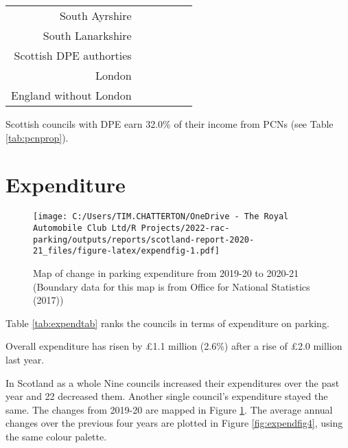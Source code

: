 \documentclass[
  12pt,
]{article}
\begin{document}
\begin{longtable}[t]{rrrrrr}
South Ayrshire & \cellcolor{white}{16.7\%} & \cellcolor{white}{21.8\%} & \cellcolor{white}{22.3\%} & \cellcolor{white}{40.4\%} & \cellcolor{white}{23.9\%}\\
South Lanarkshire & \cellcolor{white}{32.1\%} & \cellcolor{white}{30.7\%} & \cellcolor{white}{31.5\%} & \cellcolor{white}{32.2\%} & \cellcolor{white}{67.2\%}\\
Scottish DPE authorties & \cellcolor{white}{20.0\%} & \cellcolor{white}{20.0\%} & \cellcolor{white}{20.0\%} & \cellcolor{white}{20.6\%} & \cellcolor{white}{20.9\%}\\
London & \cellcolor{white}{42.0\%} & \cellcolor{white}{43.1\%} & \cellcolor{white}{45.1\%} & \cellcolor{white}{} & \cellcolor{white}{}\\
England without London & \cellcolor{white}{12.8\%} & \cellcolor{white}{13.8\%} & \cellcolor{white}{12.3\%} & \cellcolor{white}{} & \cellcolor{white}{}\\*
\end{longtable}
\endgroup{}

Scottish councils with DPE earn 32.0\% of their income from PCNs (see Table \ref{tab:pcnprop}).

\hypertarget{expenditure}{%
\section{Expenditure}\label{expenditure}}

\begin{figure}
\centering
\texttt{[image: C:/Users/TIM.CHATTERTON/OneDrive - The Royal Automobile Club Ltd/R Projects/2022-rac-parking/outputs/reports/scotland-report-2020-21\_files/figure-latex/expendfig-1.pdf]}
\caption{\label{fig:expendfig}Map of change in parking expenditure from 2019-20 to 2020-21 (Boundary data for this map is from Office for National Statistics (2017))}
\end{figure}

Table \ref{tab:expendtab} ranks the councils in terms of expenditure on parking.

Overall expenditure has risen by £1.1 million (2.6\%) after a rise of £2.0 million last year.

In Scotland as a whole Nine councils increased their expenditures over the past year and 22 decreased them. Another single council's expenditure stayed the same. The changes from 2019-20 are mapped in Figure \ref{fig:expendfig}. The average annual changes over the previous four years are plotted in Figure \ref{fig:expendfig4}, using the same colour palette.
\end{document}
